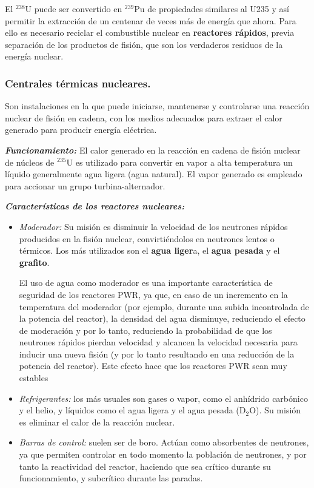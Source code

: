 			
			El $^{238}$U puede ser convertido en $^{239}$Pu de propiedades similares al U235 y así permitir la extracción de un centenar de veces más de energía que ahora. Para ello es necesario reciclar el combustible nuclear en \textbf{reactores rápidos}, previa separación de los productos de fisión, que son los verdaderos residuos de la energía nuclear.
			
			
		\subsubsection{Centrales térmicas nucleares.}
			Son instalaciones en la que puede iniciarse, mantenerse y controlarse una reacción nuclear de fisión
			en cadena, con los medios adecuados para extraer el calor generado para producir energía eléctrica.
			
			
			\textit{\textbf{Funcionamiento:}} El calor generado en la reacción en cadena de fisión nuclear de núcleos de $^{235}$U es utilizado
			para convertir en vapor a alta temperatura un líquido generalmente agua ligera (agua natural). El
			vapor generado es empleado para accionar un grupo turbina-alternador.
			
			\textit{\textbf{Características de los reactores nucleares:}}
			\begin{itemize}
				\item \textit{Moderador:} Su misión es disminuir la velocidad de los neutrones rápidos producidos
				en la fisión nuclear, convirtiéndolos en neutrones lentos o térmicos. Los más utilizados son
				el \textbf{agua liger}a, el \textbf{agua pesada} y el \textbf{grafito}.
				
				
				El uso de agua como moderador es una importante característica de seguridad de los
				reactores PWR, ya que, en caso de un incremento en la temperatura del moderador (por
				ejemplo, durante una subida incontrolada de la potencia del reactor), la densidad del agua
				disminuye, reduciendo el efecto de moderación y por lo tanto, reduciendo la probabilidad de
				que los neutrones rápidos pierdan velocidad y alcancen la velocidad necesaria para inducir
				una nueva fisión (y por lo tanto resultando en una reducción de la potencia del reactor). Este
				efecto hace que los reactores PWR sean muy estables
				
				
				\item \textit{Refrigerantes:} los más usuales son gases o vapor, como el anhídrido carbónico y el helio,
				y líquidos como el agua ligera y el agua pesada ($\text{D}_2\text{O}$). Su misión es eliminar el calor de la
				reacción nuclear.
				
				
				\item \textit{Barras de control:} suelen ser de boro. Actúan como absorbentes de neutrones, ya que
				permiten controlar en todo momento la población de neutrones, y por tanto la reactividad
				del reactor, haciendo que sea crítico durante su funcionamiento, y subcrítico durante las
				paradas.
			\end{itemize}			
			
